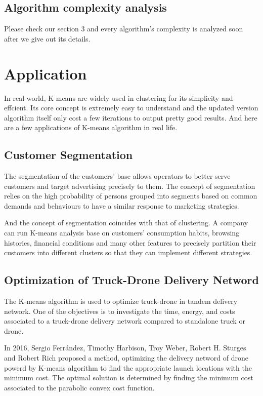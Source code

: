 \documentclass[11pt]{article}
\begin{document}
\subsection{Algorithm complexity analysis}
Please check our section 3 and every algorithm's complexity is analyzed soon after we give out its details.

\section{Application}
In real world, K-means are widely used in clustering for its simplicity and effcient. Its core concept is extremely easy to understand and the updated version algorithm itself only cost a few iterations to output pretty good results. And here are a few applications of K-means algorithm in real life.
\subsection{Customer Segmentation}
The segmentation of the customers’ base allows operators to better serve customers and target advertising precisely to them\cite{Bcil2012PrepaidTC}.
The concept of segmentation relies on the high probability of persons grouped into segments based on common demands and behaviours to have a similar response to marketing strategies.
\par And the concept of segmentation coincides with that of clustering. A company can run K-means analysis base on customers' consumption habits, browsing histories, financial conditions and many other features to precisely partition their customers into different clusters so that they can implement different strategies.\cite{Bcil2012PrepaidTC}
\subsection{Optimization of Truck-Drone Delivery Netword}
The K-means algorithm is used to optimize truck-drone in tandem delivery network. One of the objectives is to investigate the time, energy, and costs associated to a truck-drone delivery network compared to standalone truck or drone. 
\par In 2016, Sergio Ferr{\'a}ndez, Timothy Harbison, Troy Weber, Robert H. Sturges and Robert Rich proposed a method\cite{Ferrndez2016OptimizationOA}, optimizing the delivery netword of drone powerd by K-means algorithm to find the appropriate launch locations with the  minimum cost.  The optimal solution is determined by finding the minimum cost associated to the parabolic convex cost function.
\end{document}
